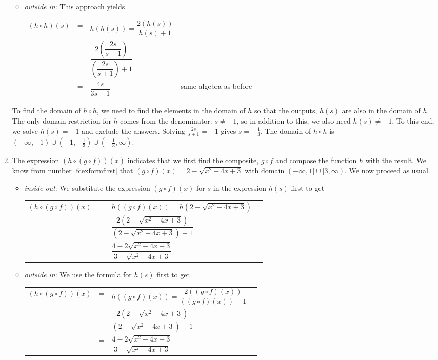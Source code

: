 \documentclass{ximera}
\begin{document}
\begin{ex}
\begin{enumerate}
\begin{itemize}
\item  \textit{outside in}: This approach yields
\begin{longtable}{rclr} $(h \circ h)(s)$ & = & $h(h(s)) = \dfrac{2 (h(s))}{h(s) + 1}$ & \\ [.25in]
& = & $\dfrac{2\left(\dfrac{2s}{s+1}\right)}{\left(\dfrac{2s}{s+1}\right)+1}$ & \\[.35in] 
& = & $\dfrac{4s}{3s+1}$ &  same algebra as before\\
 \end{longtable}

\end{itemize}

To find the domain of $h \circ h$,  we need to find the elements in the domain of $h$ so that the outputs, $h(s)$ are also in the domain of $h$.  The only domain restriction for $h$ comes from the denominator: $s \neq -1$, so in addition to this, we also need $h(s) \neq -1$.  To this end, we solve $h(s) = -1$ and exclude the answers.  Solving   $\frac{2s}{s+1} = -1$ gives $s = -\frac{1}{3}$.  The domain of $h \circ h$ is $(-\infty, -1) \cup \left(-1, -\frac{1}{3}\right) \cup \left(-\frac{1}{3}, \infty\right)$. 

\item  The expression $(h \circ (g \circ f))(x)$ indicates that we first find the composite, $g \circ f$ and compose the function $h$ with the result.  We know from number \ref{fcexformfirst} that $(g \circ f)(x) =  2 - \sqrt{x^2-4x+3}$ with domain $(-\infty, 1] \cup [3,\infty)$.  We now proceed as usual.

\begin{itemize}

\item  \textit{inside out}: We substitute the expression $(g \circ f)(x)$ for $s$ in the expression $h(s)$ first to get
\begin{longtable}{rclr} $(h \circ (g \circ f))(x)$ & = & $h((g \circ f)(x))=h\left(2 - \sqrt{x^2-4x+3}\right)$  & \\ [5pt]
 & = & $\dfrac{2 \left(2 - \sqrt{x^2-4x+3}\right)}{\left(2 - \sqrt{x^2-4x+3}\right)+1}$ & \\ [20pt]
 & = & $\dfrac{4 - 2\sqrt{x^2-4x+3}}{3 - \sqrt{x^2-4x+3}}$ & \\
 \end{longtable}

\item  \textit{outside in}:  We use the formula for $h(s)$ first to get
\begin{longtable}{rclr} $(h \circ (g \circ f))(x)$ & = & $h((g \circ f)(x))=\dfrac{2 \left( (g \circ f)(x)\right)}{  \left( (g \circ f)(x)\right) + 1}$  & \\ [15pt]
& = & $\dfrac{2 \left(2 - \sqrt{x^2-4x+3}\right)}{\left(2 - \sqrt{x^2-4x+3}\right)+1}$ & \\ [20pt]
 & = & $\dfrac{4 - 2\sqrt{x^2-4x+3}}{3 - \sqrt{x^2-4x+3}}$ & \\
 \end{longtable}
 

\end{itemize}
\end{enumerate}
\end{ex}
\end{document}
